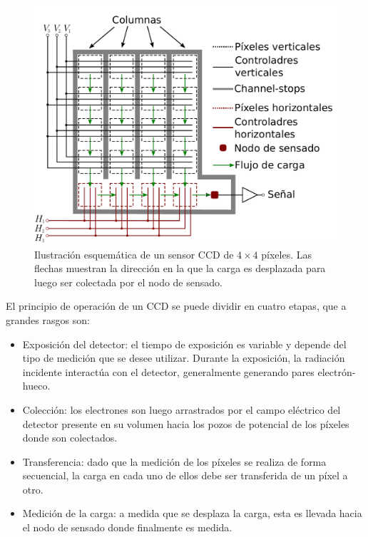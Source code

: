 \begin{figure}[h]
    \centering
        \includegraphics[scale=.5]{Figs/ArquitecturaCCD.pdf}
    \caption{\footnotesize{Ilustración esquemática de un sensor CCD de $4\times4$ píxeles. Las flechas muestran la dirección en la que la carga es desplazada para luego ser colectada por el nodo de sensado.}}
    \label{fig:ArgquitecturaCCDn}
\end{figure}
El principio de operación de un CCD se puede dividir en cuatro etapas, que a grandes rasgos son:
\begin{itemize}
    \item Exposición del detector: el tiempo de exposición es variable y depende del tipo de medición que se desee utilizar. Durante la exposición, la radiación incidente interactúa con el detector, generalmente generando pares electrón-hueco. 
    \item Colección: los electrones son luego arrastrados por el campo eléctrico del detector presente en su volumen hacia los pozos de potencial de los píxeles donde son colectados.
    \item Transferencia: dado que la medición de los píxeles se realiza de forma secuencial, la carga en cada uno de ellos debe ser transferida de un píxel a otro.
    \item Medición de la carga: a medida que se desplaza la carga, esta es llevada hacia el nodo de sensado donde finalmente es medida.
\end{itemize}
